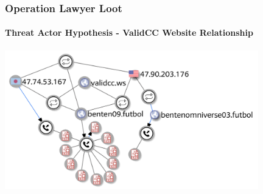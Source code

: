 \documentclass[aspectratio=169]{beamer}
\begin{document}
{
\begin{frame}
  \frametitle{Operation Lawyer Loot}
  \framesubtitle{Threat Actor Hypothesis - ValidCC Website Relationship}
  \begin{center}
    \includegraphics[width=11cm]{validcc-website-kpot-relationship}
  \end{center}
\end{frame}
}
\end{document}
